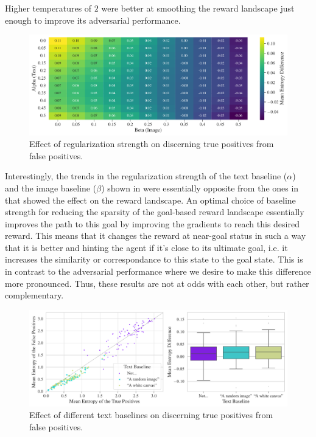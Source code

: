 Higher temperatures of \(2\) were better at smoothing the reward landscape just enough to improve its adversarial performance.

\begin{figure}[H]
    \centering
    \includegraphics[width=\textwidth]{images/alpha_beta_adversarial.pdf}
    \caption{Effect of regularization strength on discerning true positives from false positives.}
    \label{fig:clip-alpha-beta-adversarial}
\end{figure}

Interestingly, the trends in the regularization strength of the text baseline (\(\alpha\)) and the image baseline (\(\beta\)) shown in  were essentially opposite from the ones in  that showed the effect on the reward landscape.
An optimal choice of baseline strength for reducing the sparsity of the goal-based reward landscape essentially improves the path to this goal by improving the gradients to reach this desired reward.
This means that it changes the reward at near-goal status in such a way that it is better and hinting the agent if it's close to its ultimate goal, i.e. it increases the similarity or correspondance to this state to the goal state.
This is in contrast to the adversarial performance where we desire to make this difference more pronounced.
Thus, these results are not at odds with each other, but rather complementary. 

\begin{figure}[H]
    \centering
    \includegraphics[width=\textwidth]{images/baseline_adversarial_2.pdf}
    \caption{Effect of different text baselines on discerning true positives from false positives.}
    \label{fig:baseline-adversarial}
\end{figure}

